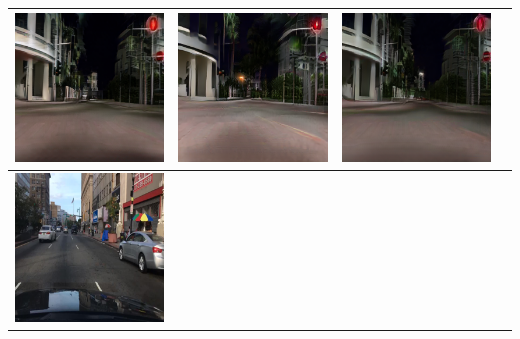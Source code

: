 \documentclass{VUMIFPSkursinis}
\begin{document}
\begin{table}[H]
{\begin{tabular}{|c|c|c|c|}
                \includegraphics[scale=0.35]{img/pvz/5_cycle_v2} & \includegraphics[scale=0.35]{img/pvz/5_cut_v2} & \includegraphics[scale=0.35]{img/pvz/5_mspc_v2}
                \\
                \hline
                \includegraphics[scale=0.35]{img/pvz/6_real} & 

\end{tabular}}
\end{table}
\end{document}
